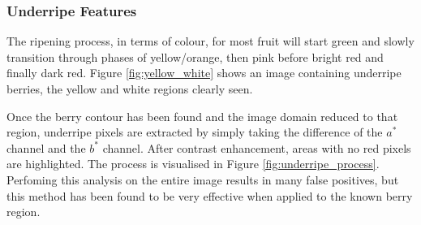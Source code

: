 \documentclass[conference]{IEEEtran}
\begin{document}
\subsubsection{Underripe Features}

The ripening process, in terms of colour, for most fruit will start green and slowly transition through phases of yellow/orange, then pink before bright red and finally dark red. Figure \ref{fig:yellow_white} shows an image containing underripe berries, the yellow and white regions clearly seen.

Once the berry contour has been found and the image domain reduced to that region, underripe pixels are extracted by simply taking the difference of the $a^*$ channel and the $b^*$ channel. After contrast enhancement, areas with no red pixels are highlighted. The process is visualised in Figure \ref{fig:underripe_process}. Perfoming this analysis on the entire image results in many false positives, but this method has been found to be very effective when applied to the known berry region.   
\end{document}
